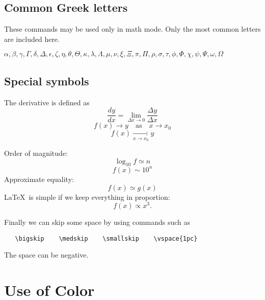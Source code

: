 \documentclass[12pt]{article}
\begin{document}
   \subsection{Common Greek letters}

   These commands may be used only in math mode. Only the most common
   letters are included here.

   $\alpha, 
   \beta, \gamma, \Gamma,
   \delta,\Delta,
   \epsilon, \zeta, \eta, \theta, \Theta, \kappa,
   \lambda, \Lambda, \mu, \nu,
   \xi, \Xi,
   \pi, \Pi,
   \rho,
   \sigma, 
   \tau,
   \phi, \Phi,
   \chi,
   \psi, \Psi,
   \omega, \Omega$

   \subsection{Special symbols}

   The derivative is defined as
   \begin{equation}
	   \frac{dy}{dx} = \lim_{\Delta x \to 0} \frac{\Delta y}
	   {\Delta x}
   \end{equation}
   \begin{equation}
	   f(x) \to y \quad \mbox{as} \quad x \to
	   x_{0}
   \end{equation}
   \begin{equation}
	   f(x) \mathop {\longrightarrow}
	   \limits_{x \to x_0} y
   \end{equation}

   \noindent Order of magnitude:
   \begin{equation}
	   \log_{10}f \simeq n
   \end{equation}
   \begin{equation}
	   f(x)\sim 10^{n}
   \end{equation}
   Approximate equality:
   \begin{equation}
	   f(x)\simeq g(x)
   \end{equation}
   \LaTeX\ is simple if we keep everything in proportion:
   \begin{equation}
	   f(x) \propto x^3 .
   \end{equation}

   Finally we can skip some space by using commands such as
   \begin{verbatim}
   \bigskip    \medskip    \smallskip    \vspace{1pc}
   \end{verbatim}
   The space can be negative.

   \section{\color{red}Use of Color}
\end{document}
